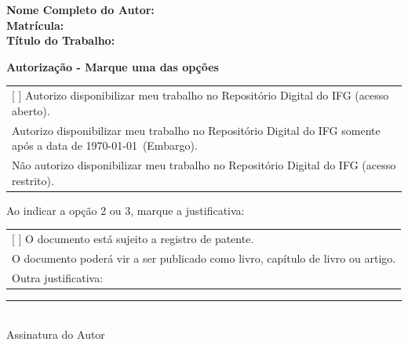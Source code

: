 \vspace{0.25cm}

\noindent\textbf{Nome Completo do Autor:} \hspace{8cm} \\[0.5cm]
\textbf{Matrícula:} \hspace{11cm} \\[0.5cm]
\textbf{Título do Trabalho:} \hspace{8.5cm}

\vspace{0.25cm}

\noindent\textbf{Autorização - Marque uma das opções}
\vspace{0.25cm}

\noindent
\begin{tabular}{p{15cm}}
[\hspace{0.25cm} ] Autorizo disponibilizar meu trabalho no Repositório Digital do IFG (acesso aberto).\\[0.25cm]
[\hspace{0.25cm} ] Autorizo disponibilizar meu trabalho no Repositório Digital do IFG somente após a data de \today~(Embargo).\\[0.25cm]
[\hspace{0.25cm} ] Não autorizo disponibilizar meu trabalho no Repositório Digital do IFG (acesso restrito).\\[0.25cm]
\end{tabular}

\vspace{0.25cm}

\noindent Ao indicar a opção 2 ou 3, marque a justificativa:
\vspace{0.25cm}

\noindent
\begin{tabular}{p{15cm}}
	[ \hspace{0.25cm} ] O documento está sujeito a registro de patente. \\[0.25cm]
	[ \hspace{0.25cm} ] O documento poderá vir a ser publicado como livro, capítulo de livro ou artigo. \\[0.25cm]
	[ \hspace{0.25cm} ] Outra justificativa: \\[0.25cm]
\end{tabular}

\vspace{0.25cm}

\noindent\rule{10cm}{0.4pt} \\[0.25cm]
\noindent Assinatura do Autor
